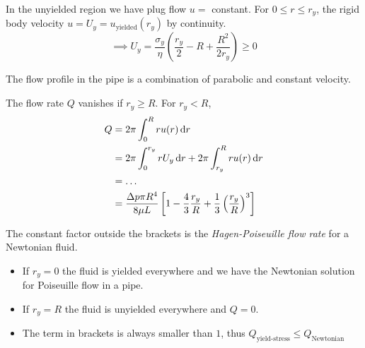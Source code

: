 \documentclass{jknotes}
\begin{document}
In the unyielded region we have plug flow $u =$ constant.  For $0 \le r \le
r_y$, the rigid body velocity $u = U_y = u_{\text{yielded}}(r_y)$ by
continuity.
\begin{equation}
	\implies U_y = \frac{\sigma_y}{\eta} \left( \frac{r_y}{2} - R +
	\frac{R^2}{2r_y}\right) \ge 0
\end{equation}

The flow profile in the pipe is a combination of parabolic and constant
velocity.
\begin{center}
\end{center}

The flow rate $Q$ vanishes if $r_y \ge R$. For $r_y < R$, 
\begin{align}
	Q &= 2\pi \int_0^R r u(r) \, \diffd r \\
	  &= 2\pi \int_0^{r_y} rU_y \, \diffd r + 2\pi \int_{r_y}^R ru(r) \,
	\diffd r \\
	&= \dots \\
	&= \frac{\Delta p \pi R^4}{8\mu L} \left[ 1 - \frac{4}{3}\frac{r_y}{R} +
	\frac{1}{3} \left( \frac{r_y}{R}\right)^3\right]
\end{align}

The constant factor outside the brackets is the \emph{Hagen-Poiseuille flow
rate} for a Newtonian fluid.
\begin{itemize}
	\item If $r_y = 0$ the fluid is yielded everywhere and we have the
		Newtonian solution for Poiseuille flow in a pipe.
	\item If $r_y = R$ the fluid is unyielded everywhere and $Q = 0$.
	\item The term in brackets is always smaller than $1$, thus
		$Q_{\text{yield-stress}} \le Q_{\text{Newtonian}}$
\end{itemize}
\end{document}
